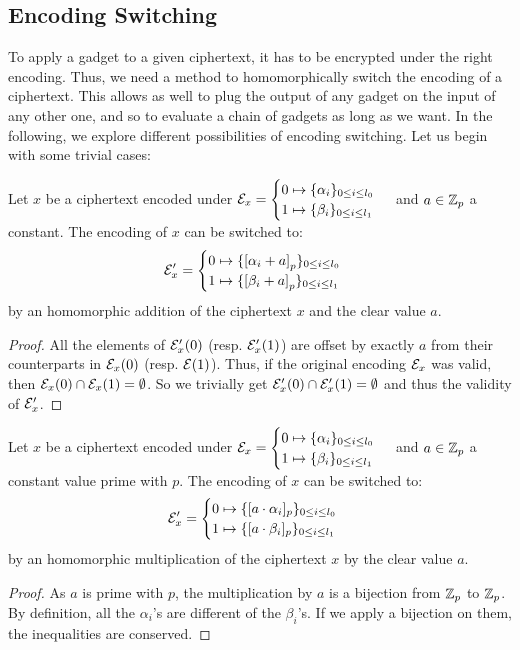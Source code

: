 \subsection{Encoding Switching}


To apply a gadget to a given ciphertext, it has to be encrypted under the right encoding. Thus, we need a method to homomorphically switch the encoding of a ciphertext. This allows as well to plug the output of any gadget on the input of any other one, and so to evaluate a chain of gadgets as long as we want. In the following, we explore different possibilities of encoding switching. Let us begin with some trivial cases:

\begin{property}
    \label{prop:sum_constant}
    Let $x$ be a ciphertext encoded under $\mathcal{E}_x = \begin{cases} 0 \mapsto \{\alpha_i\}_{0 \le i \le l_0} \\ 1 \mapsto \{\beta_i\}_{0 \le i \le l_1} \end{cases} $ and $a \in \mathbb{Z}_p$ a constant. The encoding of $x$ can be switched to:
    \[\mathcal{E}_x' = \begin{cases} 0 \mapsto \{\left [ \alpha_i + a \right ]_{p}\}_{0 \le i \le l_0} \\ 1 \mapsto \{\left [ \beta_i + a \right ]_{p}\}_{0 \le i \le l_1} \end{cases}\] by an homomorphic addition of the ciphertext $x$ and the clear value $a$. 
\end{property}

\begin{proof}
    All the elements of $\mathcal{E}_x'(0)$ (resp. $\mathcal{E}_x'(1)$) are offset by exactly $a$ from their counterparts in $\mathcal{E}_x(0)$ (resp. $\mathcal{E}(1)$). Thus, if the original encoding $\mathcal{E}_x$ was valid, then $\mathcal{E}_x(0) \cap \mathcal{E}_x(1) = \emptyset$. So we trivially get  $\mathcal{E}_x'(0) \cap \mathcal{E}_x'(1) = \emptyset$ and thus the validity of $\mathcal{E}_x'$.
\end{proof}


\begin{property}
    \label{prop:mult_constant}
    Let $x$ be a ciphertext encoded under $\mathcal{E}_x = \begin{cases} 0 \mapsto \{\alpha_i\}_{0 \le i \le l_0} \\ 1 \mapsto \{\beta_i\}_{0 \le i \le l_1} \end{cases} $ and $a \in \mathbb{Z}_p$ a constant value prime with $p$. The encoding of $x$ can be switched to:
    \[\mathcal{E}'_x = \begin{cases} 0 \mapsto \{[a \cdot \alpha_i]_p\}_{0 \le i \le l_0} \\ 1 \mapsto \{[a \cdot \beta_i]_p\}_{0 \le i \le l_1} \end{cases}\]
    by an homomorphic multiplication of the ciphertext $x$ by the clear value $a$.
\end{property}
\begin{proof}
As $a$ is prime with $p$, the multiplication by $a$ is a bijection from $\mathbb{Z}_p$ to $\mathbb{Z}_p$. By definition, all the $\alpha_i$'s are different of the $\beta_i$'s. If we apply a bijection on them, the inequalities are conserved.
\end{proof}

